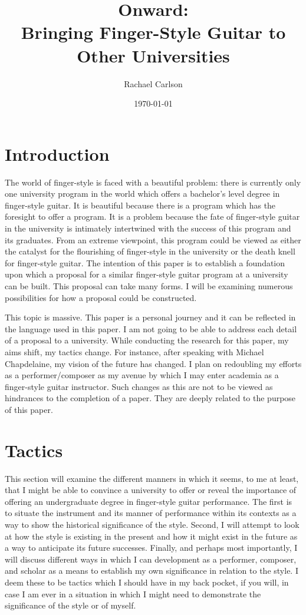 \documentclass[12pt]{article}
\title{Onward: \\ Bringing Finger-Style Guitar to Other Universities}
\author{Rachael Carlson}
\date{\today}
\begin{document}
\maketitle        

\section{Introduction}
\label{sec:introduction}
The world of finger-style is faced with a beautiful problem: there is
currently only one university program in the world which offers a
bachelor's level degree in finger-style guitar. It is beautiful
because there is a program which has the foresight to offer a
program. It is a problem because the fate of finger-style guitar in
the university is intimately intertwined with the success of this
program and its graduates. From an extreme viewpoint, this program
could be viewed as either the catalyst for the flourishing of
finger-style in the university or the death knell for finger-style
guitar. The intention of this paper is to establish a foundation upon
which a proposal for a similar finger-style guitar program at a
university can be built. This proposal can take many forms. I will be
examining numerous possibilities for how a proposal could be constructed.

This topic is massive. This paper is a personal journey and it can be
reflected in the language used in this paper. I am not going to be
able to address each detail of a proposal to a university. While
conducting the research for this paper, my aims shift, my tactics
change. For instance, after speaking with Michael Chapdelaine, my
vision of the future has changed. I plan on redoubling my efforts as a
performer/composer as my avenue by which I may enter academia as a
finger-style guitar instructor. Such changes as this are not to be
viewed as hindrances to the completion of a paper. They are deeply
related to the purpose of this paper.

\section{Tactics}
\label{sec:tactics}
This section will examine the different manners in which it seems, to
me at least, that I might be able to convince a university to offer or
reveal the importance of offering an undergraduate degree in
finger-style guitar performance. The first is to situate the
instrument and its manner of performance within its contexts as a way
to show the historical significance of the style. Second, I will
attempt to look at how the style is existing in the present and how it
might exist in the future as a way to anticipate its future
successes. Finally, and perhaps most importantly, I will discuss
different ways in which I can development as a performer, composer,
and scholar as a means to establish my own significance in relation to
the style. I deem these to be tactics which I should have in my back
pocket, if you will, in case I am ever in a situation in which I might
need to demonstrate the significance of the style or of myself.
\end{document}
